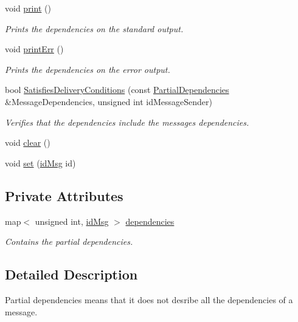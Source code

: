 \begin{DoxyCompactItemize}
void \hyperlink{class_partial_dependencies_a9a9346473ba5de6a1bdffb44145f8fca}{print} ()
\begin{DoxyCompactList}\small\item\em Prints the dependencies on the standard output. \end{DoxyCompactList}\item 
void \hyperlink{class_partial_dependencies_ac4c98e7d381b9e9efa54a094d1da729d}{print\+Err} ()
\begin{DoxyCompactList}\small\item\em Prints the dependencies on the error output. \end{DoxyCompactList}\item 
bool \hyperlink{class_partial_dependencies_a67a733dba9069541f83fecee520ccce1}{Satisfies\+Delivery\+Conditions} (const \hyperlink{class_partial_dependencies}{Partial\+Dependencies} \&Message\+Dependencies, unsigned int id\+Message\+Sender)
\begin{DoxyCompactList}\small\item\em Verifies that the dependencies include the message\textquotesingle{}s dependencies. \end{DoxyCompactList}\item 
void \hyperlink{class_partial_dependencies_a6543f75ad3391ee5d0cb0614ca97b9c0}{clear} ()
\item 
void \hyperlink{class_partial_dependencies_ad60f5e87d6d7e027c399bd1a8206a952}{set} (\hyperlink{structures_8h_a83a1d9a070efa5341da84cfd8e28d3e5}{id\+Msg} id)
\end{DoxyCompactItemize}
\subsection*{Private Attributes}
\begin{DoxyCompactItemize}
\item 
map$<$ unsigned int, \hyperlink{structures_8h_a83a1d9a070efa5341da84cfd8e28d3e5}{id\+Msg} $>$ \hyperlink{class_partial_dependencies_a4b72531ce3a3b7c4b6f02d0fe8ea1a7c}{dependencies}
\begin{DoxyCompactList}\small\item\em Contains the partial dependencies. \end{DoxyCompactList}\end{DoxyCompactItemize}


\subsection{Detailed Description}
Partial dependencies means that it does not desribe all the dependencies of a message. 

